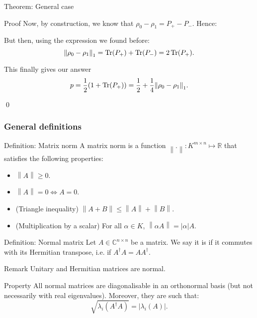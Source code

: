 \documentclass[a4paper]{article}
\begin{document}
\begin{parag}{Theorem: General case}
\begin{subparag}{Proof}
        Now, by construction, we know that $\rho_0 - \rho_1= P_+ - P_-$. Hence:  
        
        But then, using the expression we found before:
        \[\left\|\rho_0 - \rho_1\right\|_1 = \Tr\left(P_+\right) + \Tr\left(P_-\right) = 2\Tr\left(P_+\right).\]

        This finally gives our answer 
        \[p = \frac{1}{2}\left(1 + \Tr\left(P_+\right)\right) = \frac{1}{2} + \frac{1}{4} \left\|\rho_0 - \rho_1\right\|_1.\]
        
        \qed
    \end{subparag}
\end{parag}

\subsubsection{General definitions}

\begin{parag}{Definition: Matrix norm}
    A matrix norm is a function $\left\|.\right\|: K^{m \times n} \mapsto \mathbb{R}$ that satisfies the following properties:
    \begin{itemize}
        \item $\left\|A\right\| \geq 0$.
        \item $\left\|A\right\| = 0 \iff A = 0$.
        \item (Triangle inequality) $\left\|A + B\right\| \leq \left\|A\right\| + \left\|B\right\|.$
        \item (Multiplication by a scalar) For all $\alpha \in K$, $\left\|\alpha A\right\| = \left|\alpha\right| A$.
    \end{itemize}
     
\end{parag}

\begin{parag}{Definition: Normal matrix}
    Let $A \in \mathbb{C}^{n \times n}$ be a matrix. We say it is  if it commutes with its Hermitian transpose, i.e. if $A^{\dagger} A = A A ^{\dagger}$.
     
    \begin{subparag}{Remark}
        Unitary and Hermitian matrices are normal.
    \end{subparag}

    \begin{subparag}{Property}
        All normal matrices are diagonalisable in an orthonormal basis (but not necessarily with real eigenvalues). Moreover, they are such that:  
        \[\sqrt{\lambda_i\left(A^{\dagger} A\right)} = \left|\lambda_i\left(A\right)\right|.\]
    \end{subparag}
\end{parag}
\end{document}
